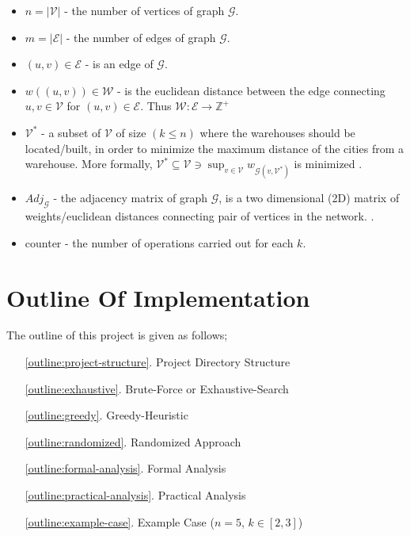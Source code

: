 \documentclass[longpaper, english, final, times]{revdetua}
\begin{document}
	\begin{keywords}%
		\begin{itemize}
			\item $n=\mathcal{|V|}$ - the number of vertices of graph $\mathcal{G}$.
			\item $m=\mathcal{|E|}$ - the number of edges of graph $\mathcal{G}$.
			\item $(u,v) \in \mathcal{E}$ - is an edge of $\mathcal{G}$.
			\item $w((u,v)) \in \mathcal{W}$ - is the euclidean distance between the edge connecting $u, v \in \mathcal{V}$ for $(u,v)\in \mathcal{E}$. Thus $\mathcal{W}:\mathcal{E}\rightarrow \mathbb{Z^+}$
			\item $\mathcal{V^{*}}$ - a subset of $\mathcal{V}$ of size $\left(k\leq n\right)$ where the warehouses should be located/built, in order to minimize the maximum distance of the cities from a warehouse. More formally, $\mathcal{V^{*}}\subseteq \mathcal{V} \ni \sup_{v\in \mathcal{V}}w_{\mathcal{G}(v, \mathcal{V^{*}})}$ is minimized \cite{kcenterProblem}.
			\item $Adj_\mathcal{G}$ - the adjacency matrix of graph $\mathcal{G}$, is a two dimensional (2D) matrix of weights/euclidean distances connecting pair of vertices in the network. \cite{adjacencymatrixdefinition}.
			\item counter - the number of operations carried out for each $k$.
		\end{itemize}
	\end{keywords}
	

	\section{Outline Of Implementation}
		The outline of this project is given as follows;
		\begin{enumerate}[label=(\arabic*)]
			\item[\ref{outline:project-structure}.] Project Directory Structure 
			\item[\ref{outline:exhaustive}.] Brute-Force or Exhaustive-Search
			\item[\ref{outline:greedy}.] Greedy-Heuristic
			\item[\ref{outline:randomized}.] Randomized Approach
			\item[\ref{outline:formal-analysis}.] Formal Analysis
			\item[\ref{outline:practical-analysis}.] Practical Analysis
			\item[\ref{outline:example-case}.] Example Case ($n=5$, $k\in [2,3]$)
		\end{enumerate}
	
\end{document}
